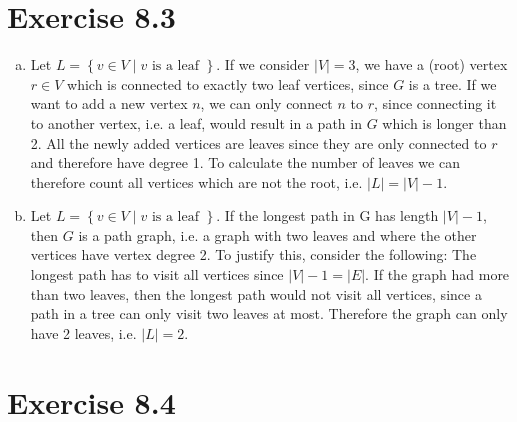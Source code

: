 \documentclass{article} %
\newcommand{\homeworkNumber}{8}
\begin{document}
\section*{Exercise \homeworkNumber.3}

\begin{enumerate}[(a)]
	\item Let \( L = \left\{ v \in V \mid v\text{ is a leaf } \right\} \). If we consider \( |V| = 3\), we have a (root) vertex \( r \in V \) which is connected to exactly two leaf vertices, since \( G \) is a tree. If we want to add a new vertex \( n \), we can only connect \( n \) to \( r \), since connecting it to another vertex, i.e. a leaf, would result in a path in \( G \) which is longer than 2. All the newly added vertices are leaves since they are only connected to \( r \) and therefore have degree 1. To calculate the number of leaves we can therefore count all vertices which are not the root, i.e. \( |L| = |V| - 1\).
	\item Let \( L = \left\{ v \in V \mid v\text{ is a leaf } \right\} \). If the longest path in G has length \( |V| - 1\), then \( G \) is a path graph, i.e. a graph with two leaves and where the other vertices have vertex degree 2. To justify this, consider the following: The longest path has to visit all vertices since \( |V| - 1 = |E| \). If the graph had more than two leaves, then the longest path would not visit all vertices, since a path in a tree can only visit two leaves at most. Therefore the graph can only have 2 leaves, i.e. \( |L| = 2 \).
\end{enumerate}



\section*{Exercise \homeworkNumber.4}
\end{document}
